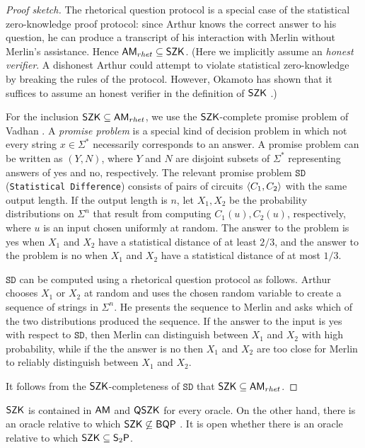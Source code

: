 \begin{proof}[Proof sketch]
The rhetorical question protocol is a special case of the statistical 
zero-knowledge proof protocol: since Arthur knows the correct answer to his 
question, he can produce a transcript of his interaction with Merlin without 
Merlin's assistance. Hence $\mathsf{AM}_{rhet}\subseteq\mathsf{SZK}$. (Here we 
implicitly assume an \textit{honest verifier}. A dishonest Arthur could attempt to
violate statistical zero-knowledge by breaking the rules of the protocol. However,
Okamoto has shown that it suffices to assume an honest verifier in the definition 
of $\mathsf{SZK}$ \cite{okamoto2000relationships}.) 

For the inclusion $\mathsf{SZK}\subseteq\mathsf{AM}_{rhet}$, we use the $\mathsf{SZK}$-complete promise problem of Vadhan \cite{sahai2003complete}. A \textit{promise problem} is a special kind of decision problem in which not every string $x\in\Sigma^*$ necessarily corresponds to an answer. A promise problem can be written as $(Y,N)$, where $Y$ and $N$ are disjoint subsets of $\Sigma^*$ representing answers of yes and no, respectively. The relevant promise problem $\mathtt{SD}$ (\texttt{Statistical Difference}) consists of pairs of circuits $\left\langle C_1,C_2\right\rangle$ with the same output length. If the output length is $n$, let $X_1,X_2$ be the probability distributions on $\Sigma^n$ that result from computing $C_1(u),C_2(u)$, respectively, where $u$ is an input chosen uniformly at random. The answer to the problem is yes when $X_1$ and $X_2$ have a statistical distance of at least $2/3$, and the answer to the problem is no when $X_1$ and $X_2$ have a statistical distance of at most $1/3$.

$\mathtt{SD}$ can be computed using a rhetorical question protocol as follows. Arthur chooses $X_1$ or $X_2$ at random and uses the chosen random variable to create a sequence of strings in $\Sigma^n$. He presents the sequence to Merlin and asks which of the two distributions produced the sequence. If the answer to the input is yes with respect to $\mathtt{SD}$, then Merlin can distinguish between $X_1$ and $X_2$ with high probability, while if the the answer is no then $X_1$ and $X_2$ are too close for Merlin to reliably distinguish between $X_1$ and $X_2$.

It follows from the $\mathsf{SZK}$-completeness of $\mathtt{SD}$ that $\mathsf{SZK}\subseteq\mathsf{AM}_{rhet}$.
\end{proof}

$\mathsf{SZK}$ is contained in $\mathsf{AM}$ and $\mathsf{QSZK}$ for every oracle. On 
the other hand, there is an oracle relative to which 
$\mathsf{SZK}\not\subseteq\mathsf{BQP}$ \cite{aaronson2002quantum}. It is open 
whether there is an oracle relative to which $\mathsf{SZK}\subseteq\mathsf{S}_2\mathsf{P}$.


